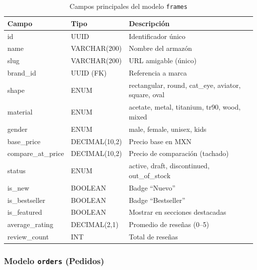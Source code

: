 \documentclass[12pt, a4paper]{article}
\begin{document}
\begin{table}[H]
\centering
\small
\begin{tabularx}{\textwidth}{llX}
\toprule
\textbf{Campo} & \textbf{Tipo} & \textbf{Descripci\'{o}n} \\
\midrule
id & UUID & Identificador \'{u}nico \\
name & VARCHAR(200) & Nombre del armaz\'{o}n \\
slug & VARCHAR(200) & URL amigable (\'{u}nico) \\
brand\_id & UUID (FK) & Referencia a marca \\
shape & ENUM & rectangular, round, cat\_eye, aviator, square, oval \\
material & ENUM & acetate, metal, titanium, tr90, wood, mixed \\
gender & ENUM & male, female, unisex, kids \\
base\_price & DECIMAL(10,2) & Precio base en MXN \\
compare\_at\_price & DECIMAL(10,2) & Precio de comparaci\'{o}n (tachado) \\
status & ENUM & active, draft, discontinued, out\_of\_stock \\
is\_new & BOOLEAN & Badge ``Nuevo'' \\
is\_bestseller & BOOLEAN & Badge ``Bestseller'' \\
is\_featured & BOOLEAN & Mostrar en secciones destacadas \\
average\_rating & DECIMAL(2,1) & Promedio de rese\~{n}as (0--5) \\
review\_count & INT & Total de rese\~{n}as \\
\bottomrule
\end{tabularx}
\caption{Campos principales del modelo \texttt{frames}}
\end{table}

\subsubsection{Modelo \texttt{orders} (Pedidos)}
\end{document}

